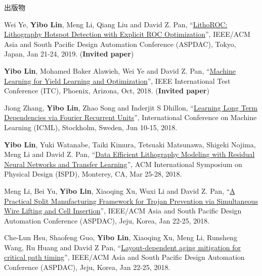 \begin{rSection}{出版物}
\begin{description}[font=\normalfont, rightmargin=2em]
{}
            

\item[{[C19]}]{
        Wei Ye, \textbf{Yibo Lin}, Meng Li, Qiang Liu and David Z. Pan, 
    ``\href{https://doi.org/10.1145/3287624.3288746}{LithoROC: Lithography Hotspot Detection with Explicit ROC Optimization}'', 
    IEEE/ACM Asia and South Pacific Design Automation Conference (ASPDAC), Tokyo, Japan, Jan 21-24, 2019.
    (\textbf{Invited paper})
}
            

\item[{[C18]}]{
        \textbf{Yibo Lin}, Mohamed Baker Alawieh, Wei Ye and David Z. Pan, 
    ``\href{https://doi.org/10.1109/TEST.2018.8624733}{Machine Learning for Yield Learning and Optimization}'', 
    IEEE International Test Conference (ITC), Phoenix, Arizona, Oct, 2018.
    (\textbf{Invited paper})
}
            

\item[{[C17]}]{
        Jiong Zhang, \textbf{Yibo Lin}, Zhao Song and Inderjit S Dhillon, 
    ``\href{https://arxiv.org/pdf/1803.06585.pdf}{Learning Long Term Dependencies via Fourier Recurrent Units}'', 
    International Conference on Machine Learning (ICML), Stockholm, Sweden, Jun 10-15, 2018.
    
}
            

\item[{[C16]}]{
        \textbf{Yibo Lin}, Yuki Watanabe, Taiki Kimura, Tetsuaki Matsunawa, Shigeki Nojima, Meng Li and David Z. Pan, 
    ``\href{https://doi.org/10.1145/3177540.3178242}{Data Efficient Lithography Modeling with Residual Neural Networks and Transfer Learning}'', 
    ACM International Symposium on Physical Design (ISPD), Monterey, CA, Mar 25-28, 2018.
    
}
            

\item[{[C15]}]{
        Meng Li, Bei Yu, \textbf{Yibo Lin}, Xiaoqing Xu, Wuxi Li and David Z. Pan, 
    ``\href{https://doi.org/10.1109/ASPDAC.2018.8297316}{A Practical Split Manufacturing Framework for Trojan Prevention via Simultaneous Wire Lifting and Cell Insertion}'', 
    IEEE/ACM Asia and South Pacific Design Automation Conference (ASPDAC), Jeju, Korea, Jan 22-25, 2018.
    
}
            

\item[{[C14]}]{
        Che-Lun Hsu, Shaofeng Guo, \textbf{Yibo Lin}, Xiaoqing Xu, Meng Li, Runsheng Wang, Ru Huang and David Z Pan, 
    ``\href{https://doi.org/10.1109/ASPDAC.2018.8297298}{Layout-dependent aging mitigation for critical path timing}'', 
    IEEE/ACM Asia and South Pacific Design Automation Conference (ASPDAC), Jeju, Korea, Jan 22-25, 2018.
    
}
\end{description}
\end{rSection}

